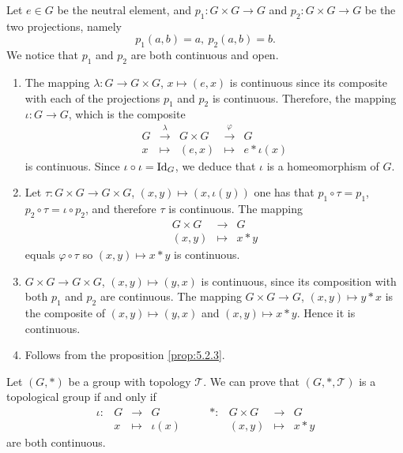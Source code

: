 \begin{proofenv}
    Let $e \in G$ be the neutral element,
    and $p_1 : G \times G \rightarrow G$ and $p_2 : G \times G \rightarrow G$ be the two projections,
    namely $$ p_1(a,b) = a,\ p_2(a,b) = b.$$
    We notice that $p_1$ and $p_2$ are both continuous and open.
    \begin{enumerate}
        \item The mapping $\lambda : G \rightarrow G \times G$, $x \mapsto (e,x)$ is continuous since its composite with each of the projections $p_1$ and $p_2$ is continuous.
            Therefore, the mapping $\iota : G \rightarrow G$, which is the composite 
            $$\begin{array}{ccccl}
                G & \overset{\lambda}{\longrightarrow} & G \times G & \overset{\varphi}{\longrightarrow} & G\\
                x & \longmapsto & (e,x) & \longmapsto & e* \iota(x)
            \end{array}$$
            is continuous.
            Since $\iota \circ \iota = \operatorname{\mathrm{Id}}_{G}$, we deduce that $\iota$ is a homeomorphism of $G$.
        \item Let $\tau : G \times G \rightarrow G \times G$, $(x,y) \mapsto (x, \iota(y))$ one has that $p_1 \circ \tau = p_1$, $p_2 \circ \tau = \iota \circ p_2$,
            and therefore $\tau$ is continuous.
            The mapping
            $$ \begin{array}{rrcl}
                G \times G & \longrightarrow & G\\
                (x,y) & \longmapsto & x*y
            \end{array}$$
            equals $\varphi \circ \tau$ so $(x,y) \mapsto x*y$ is continuous.
        \item $G \times G \rightarrow G \times G$, $(x,y) \mapsto (y,x)$ is continuous,
            since its composition with both $p_1$ and $p_2$ are continuous.
            The mapping $G \times G \rightarrow G$, $(x,y) \mapsto y*x$ is the composite of $(x,y) \mapsto (y,x)$ and $(x,y)\mapsto x*y$.
            Hence it is continuous.
        \item Follows from the proposition \ref{prop:5.2.3}.
    \end{enumerate}
\end{proofenv}

\begin{remark}
    Let $(G,*)$ be a group with topology $\mathscr{T}$.
    We can prove that $(G,*,\mathscr{T})$ is a topological group if and only if 
    $$\begin{array}{rrclcrrcl}
        \iota : & G & \longrightarrow & G & \quad & * : & G \times G & \longrightarrow & G \\
        & x & \longmapsto & \iota(x) & \quad & & (x,y) & \longmapsto & x*y
    \end{array}$$
    are both continuous.
\end{remark}

